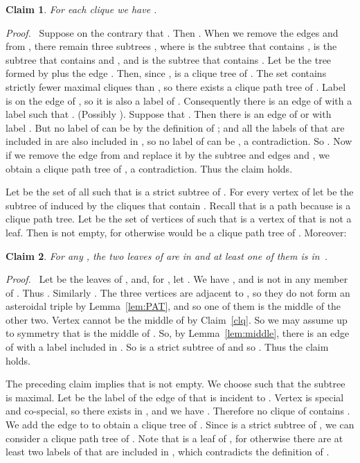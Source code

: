 \documentclass[11pt]{article}
\newtheorem{claim}{Claim}
\newenvironment{proofcl}{\noindent \emph{Proof.}\ }{Thus the claim
holds.  \hfill \vspace{1em}}
\begin{document}
\begin{claim}
   \label{claim:L'}
   For each clique  we have .
   \end{claim}
\begin{proofcl}
Suppose on the contrary that .  Then .  When we remove the edges  and 
from , there remain three subtrees , where 
is the subtree that contains ,  is the subtree that contains
 and , and  is the subtree that contains
.  Let  be the tree formed by 
plus the edge .  Then, since ,  is a clique tree of .  The set
 contains strictly fewer maximal cliques than
, so there exists a clique path tree  of .  Label  is on the edge  of
, so it is also a label of .  Consequently there is an edge
 of  with a label  such that .  (Possibly ).  Suppose that .  Then there is an edge of  or  with label
.  But no label of  can be  by the definition of ; and all the labels of  that are included in  are also
included in , so no label of  can be , a
contradiction.  So .  Now if we remove the edge
 from  and replace it by the subtree  and edges 
and , we obtain a clique path tree of , a
contradiction.
\end{proofcl}



Let  be the set of all  such that 
is a strict subtree of .  For every vertex  of
 let  be the subtree of  induced
by the cliques that contain .  Recall that  is a path
because  is a clique path tree.  Let  be the set of vertices
 of  such that  is a vertex of  that is not a leaf.
Then  is not empty, for otherwise  would be a clique path
tree of .  Moreover:
\begin{claim}\label{cla}
    For any , the two leaves of  are in  and
    at least one of them is in~.
    \end{claim}
\begin{proofcl}
Let  be the leaves of , and, for , let
.  We have , and  is
not in any member of .  Thus .  Similarly .  The three vertices  are adjacent to , so they do not form an asteroidal
triple by Lemma~\ref{lem:PAT}, and so one of them is the middle of the
other two.  Vertex  cannot be the middle of  by
Claim~\ref{clq}.  So we may assume up to symmetry that  is the
middle of .  So, by Lemma~\ref{lem:middle}, there is an
edge of  with a label included in .  So
 is a strict subtree of  and so
.
\end{proofcl}

The preceding claim implies that  is not empty.  We
choose  such that the subtree  is maximal.
Let  be the label of the edge of  that is incident
to .  Vertex  is special and co-special, so there exists 
in , and we have .  Therefore no
clique of  contains .  We
add the edge  to  to obtain a clique tree  of
.  Since  is a strict subtree of
, we can consider a clique path tree  of .  Note that  is a leaf of , for otherwise there are at
least two labels of  that are included in , which contradicts
the definition of .
\end{document}
